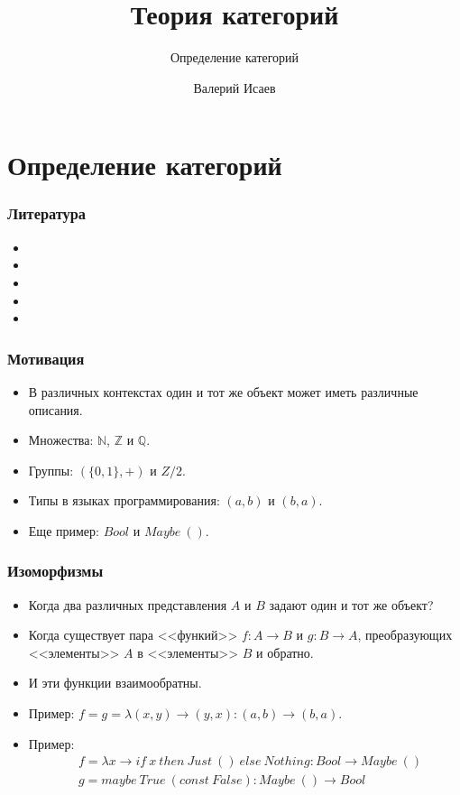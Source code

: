 \documentclass{beamer}
\begin{document}
\title{Теория категорий}
\subtitle{Определение категорий}
\author{Валерий Исаев}
\maketitle

\section{Определение категорий}

\begin{frame}

\frametitle{Литература}
\begin{itemize}
\item {}
\item {}
\item {}
\item {}
\item {}
\end{itemize}
\end{frame}

\begin{frame}
\frametitle{Мотивация}
\begin{itemize}
\item В различных контекстах один и тот же объект может иметь различные описания.
\item Множества: $\mathbb{N}$, $\mathbb{Z}$ и $\mathbb{Q}$.
\item Группы: $(\{ 0, 1 \}, +)$ и $Z/2$.
\item Типы в языках программирования: $(a, b)$ и $(b, a)$.
\item Еще пример: $Bool$ и $Maybe\ ()$.
\end{itemize}
\end{frame}

\begin{frame}
\frametitle{Изоморфизмы}
\begin{itemize}
\item Когда два различных представления $A$ и $B$ задают один и тот же объект?
\item Когда существует пара <<функий>> $f : A \to B$ и $g : B \to A$, преобразующих <<элементы>> $A$ в <<элементы>> $B$ и обратно.
\item И эти функции взаимообратны.
\item Пример: $f = g = \lambda (x, y) \to (y, x) : (a, b) \to (b, a)$.
\item Пример:
\begin{align*}
& f = \lambda x \to if\ x\ then\ Just\ ()\ else\ Nothing : Bool \to Maybe\ () \\
& g = maybe\ True\ (const\ False) : Maybe\ () \to Bool
\end{align*}
\end{itemize}
\end{frame}
\end{document}
